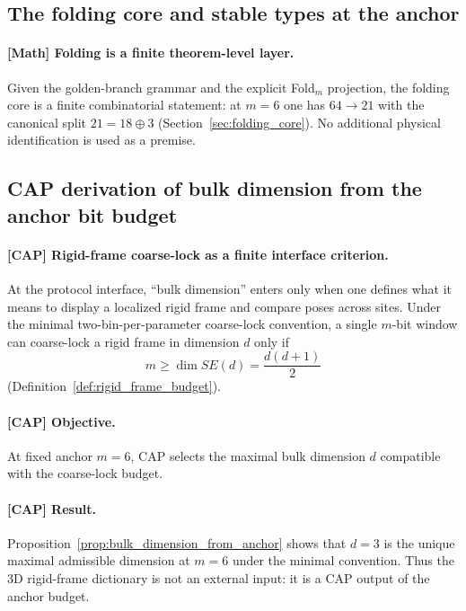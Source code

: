\subsection{The folding core and stable types at the anchor}
\label{subsec:tick_cap_folding_core}

\paragraph{[Math] Folding is a finite theorem-level layer.}
Given the golden-branch grammar and the explicit Fold$_m$ projection, the folding core is a finite combinatorial statement:
at $m=6$ one has $64\to 21$ with the canonical split $21=18\oplus 3$ (Section~\ref{sec:folding_core}).
No additional physical identification is used as a premise.

\subsection{CAP derivation of bulk dimension from the anchor bit budget}
\label{subsec:tick_cap_bulk_dimension}

\paragraph{[CAP] Rigid-frame coarse-lock as a finite interface criterion.}
At the protocol interface, ``bulk dimension'' enters only when one defines what it means to display a localized rigid frame and compare poses across sites.
Under the minimal two-bin-per-parameter coarse-lock convention, a single $m$-bit window can coarse-lock a rigid frame in dimension $d$ only if
\[
m\ge \dim SE(d)=\frac{d(d+1)}{2}
\]
(Definition~\ref{def:rigid_frame_budget}).

\paragraph{[CAP] Objective.}
At fixed anchor $m=6$, CAP selects the maximal bulk dimension $d$ compatible with the coarse-lock budget.

\paragraph{[CAP] Result.}
Proposition~\ref{prop:bulk_dimension_from_anchor} shows that $d=3$ is the unique maximal admissible dimension at $m=6$ under the minimal convention.
Thus the $3$D rigid-frame dictionary is not an external input: it is a CAP output of the anchor budget.

